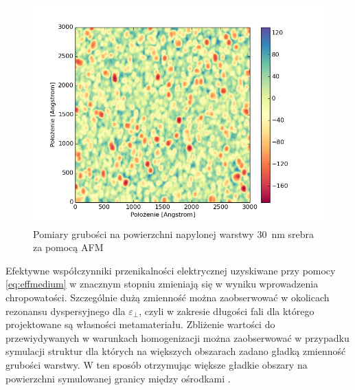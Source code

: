\begin{figure}[bt]
		\includegraphics[width=\textwidth]{images/multilayer/ag30nm-afm-measure.png}
		\caption{Pomiary grubości na powierzchni napylonej warstwy $30$~nm srebra za pomocą AFM} 
		\label{fig:ag30nm-afmmeasure}
\end{figure}


Efektywne współczynniki przenikalności elektrycznej uzyskiwane przy pomocy \ref{eq:effmedium} w znacznym stopniu zmieniają się w wyniku wprowadzenia chropowatości. Szczególnie dużą zmienność można zaobserwować w okolicach rezonansu dyspersyjnego dla $\varepsilon_{\perp}$, czyli w zakresie długości fali dla którego projektowane są własności metamateriału.  Zbliżenie wartości do przewiydywanych w warunkach homogenizacji można zaobserwować w przypadku symulacji struktur dla których na większych obszarach zadano gładką zmienność grubości warstwy. W ten sposób otrzymując większe gładkie obszary na powierzchni symulowanej granicy między ośrodkami \cite{ludwig2012impact}. 

